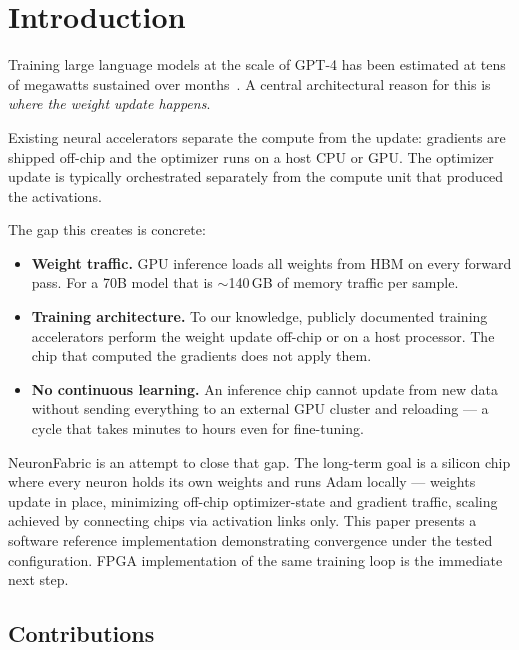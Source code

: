 \documentclass[11pt]{article}
\begin{document}
\section{Introduction}

Training large language models at the scale of GPT-4 has been estimated at tens of megawatts
sustained over months~\cite{patterson2022carbon}.
A central architectural reason for this is \emph{where the weight update happens}.

Existing neural accelerators separate the compute from the update: gradients are shipped
off-chip and the optimizer runs on a host CPU or GPU.
The optimizer update is typically orchestrated separately from the compute unit that produced the activations.

The gap this creates is concrete:

\begin{itemize}
  \item \textbf{Weight traffic.} GPU inference loads all weights from HBM on every
    forward pass. For a 70B model that is $\sim$140\,GB of memory traffic per sample.
  \item \textbf{Training architecture.} To our knowledge, publicly documented training
    accelerators perform the weight update off-chip or on a host processor.
    The chip that computed the gradients does not apply them.
  \item \textbf{No continuous learning.} An inference chip cannot update from new data
    without sending everything to an external GPU cluster and reloading --- a cycle
    that takes minutes to hours even for fine-tuning.
\end{itemize}

NeuronFabric is an attempt to close that gap. The long-term goal is a silicon chip
where every neuron holds its own weights and runs Adam locally --- weights update in
place, minimizing off-chip optimizer-state and gradient traffic, scaling achieved by connecting chips via
activation links only. This paper presents a software reference implementation demonstrating convergence under the tested configuration. FPGA implementation of the same training loop is the immediate next step.

\subsection{Contributions}
\end{document}
